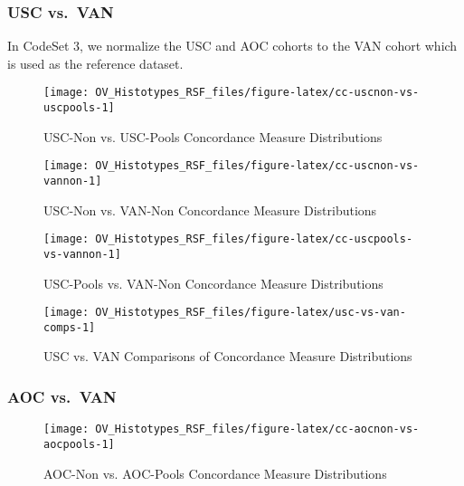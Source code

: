 \documentclass[
]{report}
\begin{document}
\hypertarget{usc-vs.-van}{%
\subsubsection{USC vs.~VAN}\label{usc-vs.-van}}

In CodeSet 3, we normalize the USC and AOC cohorts to the VAN cohort which is used as the reference dataset.

\begin{figure}[H]

{\centering \texttt{[image: OV\_Histotypes\_RSF\_files/figure-latex/cc-uscnon-vs-uscpools-1]} 

}

\caption{USC-Non vs. USC-Pools Concordance Measure Distributions}\label{fig:cc-uscnon-vs-uscpools}
\end{figure}

\begin{figure}[H]

{\centering \texttt{[image: OV\_Histotypes\_RSF\_files/figure-latex/cc-uscnon-vs-vannon-1]} 

}

\caption{USC-Non vs. VAN-Non Concordance Measure Distributions}\label{fig:cc-uscnon-vs-vannon}
\end{figure}

\begin{figure}[H]

{\centering \texttt{[image: OV\_Histotypes\_RSF\_files/figure-latex/cc-uscpools-vs-vannon-1]} 

}

\caption{USC-Pools vs. VAN-Non Concordance Measure Distributions}\label{fig:cc-uscpools-vs-vannon}
\end{figure}

\begin{figure}[H]

{\centering \texttt{[image: OV\_Histotypes\_RSF\_files/figure-latex/usc-vs-van-comps-1]} 

}

\caption{USC vs. VAN Comparisons of Concordance Measure Distributions}\label{fig:usc-vs-van-comps}
\end{figure}

\hypertarget{aoc-vs.-van}{%
\subsubsection{AOC vs.~VAN}\label{aoc-vs.-van}}

\begin{figure}[H]

{\centering \texttt{[image: OV\_Histotypes\_RSF\_files/figure-latex/cc-aocnon-vs-aocpools-1]} 

}

\caption{AOC-Non vs. AOC-Pools Concordance Measure Distributions}\label{fig:cc-aocnon-vs-aocpools}
\end{figure}
\end{document}
